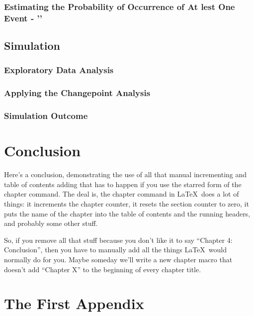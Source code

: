 \documentclass[12pt,twoside]{reedthesis}
\begin{document}
\begin{enumerate}
\begin{enumerate}
\subsection{Estimating the Probability of Occurrence of At lest One Event - '\epsilon'}


\section{Simulation}
\subsection{Exploratory Data Analysis}
\subsection{Applying the Changepoint Analysis}
\subsection{Simulation Outcome}









\chapter*{Conclusion}
	\setcounter{chapter}{4}
	\setcounter{section}{0}
	
Here's a conclusion, demonstrating the use of all that manual incrementing and table of contents adding that has to happen if you use the starred form of the chapter command. The deal is, the chapter command in \LaTeX\ does a lot of things: it increments the chapter counter, it resets the section counter to zero, it puts the name of the chapter into the table of contents and the running headers, and probably some other stuff. 

So, if you remove all that stuff because you don't like it to say ``Chapter 4: Conclusion'', then you have to manually add all the things \LaTeX\ would normally do for you. Maybe someday we'll write a new chapter macro that doesn't add ``Chapter X'' to the beginning of every chapter title.


    \appendix
      \chapter{The First Appendix}

\end{enumerate}
\end{enumerate}
\end{document}
